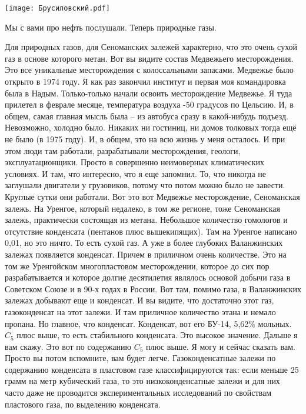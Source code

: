 \documentclass[main.tex]{subfiles}
\begin{document}
\begin{center}
\texttt{[image: Брусиловский.pdf]}
\end{center}

Мы с вами про нефть послушали.
Теперь природные газы.

Для природных газов, для Сеноманских залежей характерно, что это очень сухой газ в основе которого метан.
Вот вы видите состав Медвежьего месторождения.
Это все уникальные месторождения с колоссальными запасами.
Медвежье было открыто в 1974 году.
Я как раз закончил институт и первая моя командировка была в Надым.
Только-только начали освоить месторождение Медвежье.
Я туда прилетел в феврале месяце, температура воздуха -50 градусов по Цельсию.
И, в общем, самая главная мысль была -- из автобуса сразу в какой-нибудь подъезд.
Невозможно, холодно было.
Никаких ни гостиниц, ни домов толковых тогда ещё не было (в 1975 году).
И, в общем, это на всю жизнь у меня осталось.
И при этом люди там работали, разрабатывали месторождения, геологи, эксплуатационщики.
Просто в совершенно неимоверных климатических условиях.
И там, что интересно, что я еще запомнил.
То, что никогда не заглушали двигатели у грузовиков, потому что потом можно было не завести.
Круглые сутки они работали.
Вот это вот Медвежье месторождение, Сеноманская залежь.
На Уренгое, который недалеко, в том же регионе, тоже Сеноманская залежь, практически состоящая из метана.
Небольшое количество гомологов и отсутствие конденсата (пентанов плюс вышекипящих).
Там на Уренгое написано 0,01, но это ничто.
То есть сухой газ.
А уже в более глубоких Валанжинских залежах появляется конденсат.
Причем в приличном очень количестве.
Это на том же Уренгойском многопластовом месторождении, которое до сих пор разрабатывается и которое долгие десятилетия являлось основой добычи газа в Советском Союзе и в 90-х годах в России.
Вот там, помимо газа, в Валанжинских залежах добывают еще и конденсат.
И вы видите, что достаточно этот газ, газоконденсат на этот залежи.
И там приличное количество этана и немало пропана.
Но главное, что конденсат.
Конденсат, вот его БУ-14, 5,62\% мольных.
$C_5$ плюс выше, то есть стабильного конденсата.
Это высокое значение.
Дальше я вам скажу.
Это вот по содержанию $C_5$ плюс выше.
Я могу и сейчас сказать вам.
Просто вы потом вспомните, вам будет легче.
Газоконденсатные залежи по содержанию конденсата в пластовом газе классифицируются так: если меньше 25 грамм на метр кубический газа, то это низкоконденсатные залежи и для них часто даже не проводится экспериментальных исследований по свойствам пластового газа, по выделению конденсата.
\end{document}
